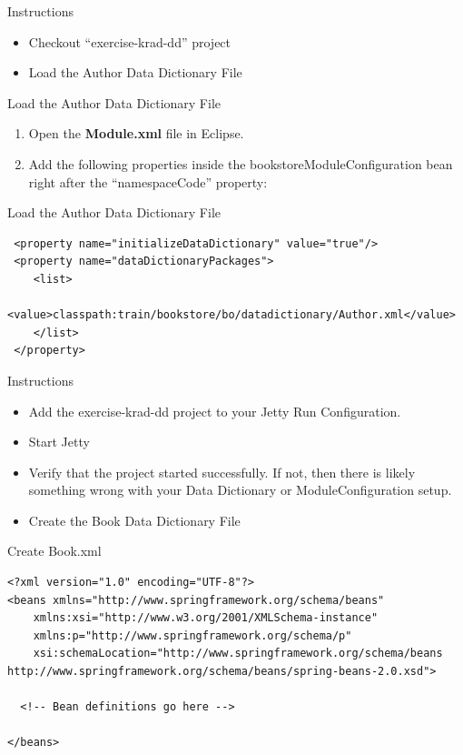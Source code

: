 \documentclass[xcolor=dvipsnames,14pt,professionalfonts]{beamer}
\begin{document}
\begin{frame}{Instructions}
  \begin{itemize}
  \item Checkout “exercise-krad-dd” project
  \item Load the Author Data Dictionary File
  \end{itemize}
\end{frame}

\begin{frame}{Load the Author Data Dictionary File}
  \begin{enumerate}
  \item Open the \textbf{Module.xml} file in Eclipse.
  \item Add the following properties inside the
    bookstoreModuleConfiguration bean right after the “namespaceCode”
    property:
  \end{enumerate}
\end{frame}

\begin{frame}[fragile]{Load the Author Data Dictionary File}
    \begin{verbatim}
 <property name="initializeDataDictionary" value="true"/>
 <property name="dataDictionaryPackages">
    <list>
        <value>classpath:train/bookstore/bo/datadictionary/Author.xml</value>
    </list>
 </property>
    \end{verbatim}
\end{frame}

    
\begin{frame}{Instructions}
  \begin{itemize}
    \item Add the exercise-krad-dd project to your Jetty Run
      Configuration.
      \item Start Jetty
    \item Verify that the project started successfully.  If not, then there is likely something wrong with your Data Dictionary or ModuleConfiguration setup.
    \item Create the Book Data Dictionary File
  \end{itemize}
\end{frame}

\begin{frame}[fragile]{Create Book.xml}
    \begin{verbatim}
<?xml version="1.0" encoding="UTF-8"?>
<beans xmlns="http://www.springframework.org/schema/beans"
	xmlns:xsi="http://www.w3.org/2001/XMLSchema-instance"
	xmlns:p="http://www.springframework.org/schema/p"
	xsi:schemaLocation="http://www.springframework.org/schema/beans http://www.springframework.org/schema/beans/spring-beans-2.0.xsd">

  <!-- Bean definitions go here -->

</beans>
\end{verbatim}
\end{frame}
\end{document}
